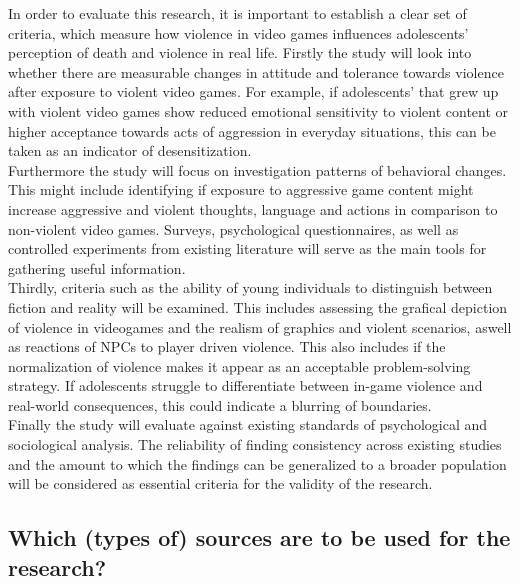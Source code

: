In order to evaluate this research, it is important to establish a clear set of criteria, 
which measure how violence in video games influences adolescents' perception of death and violence in real life.
Firstly the study will look into whether there are measurable changes in attitude and tolerance towards violence after exposure to violent
video games. For example, if adolescents' that grew up with violent video games show reduced emotional sensitivity to violent content
or higher acceptance towards acts of aggression in everyday situations, this can be taken as an indicator of desensitization. \\
Furthermore the study will focus on investigation patterns of behavioral changes. This might include identifying if exposure to aggressive 
game content might increase aggressive and violent thoughts, language and actions in comparison to non-violent video games. Surveys, 
psychological questionnaires, as well as controlled experiments from existing literature will serve as the main tools for gathering useful information. \\
Thirdly, criteria such as the ability of young individuals to distinguish between fiction and reality will be examined. This includes assessing
the grafical depiction of violence in videogames and the realism of graphics and violent scenarios, aswell as reactions of NPCs to player driven violence.
This also includes if the normalization of violence makes it appear as an acceptable problem-solving strategy. If adolescents struggle to
differentiate between in-game violence and real-world consequences, this could indicate a blurring of boundaries. \\
Finally the study will evaluate against existing standards of psychological and sociological analysis. The reliability of finding consistency across
existing studies and the amount to which the findings can be generalized to a broader population will be considered as essential criteria for the
validity of the research.

\subsection{Which (types of) sources are to be used for the research?}

